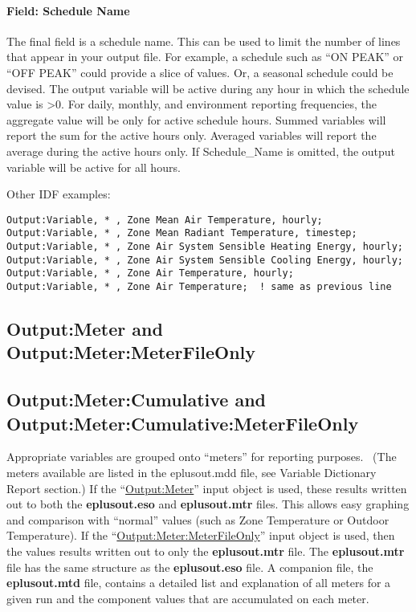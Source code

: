 \paragraph{Field: Schedule Name}\label{field-schedule-name-004}

The final field is a schedule name. This can be used to limit the number of lines that appear in your output file. For example, a schedule such as ``ON PEAK'' or ``OFF PEAK'' could provide a slice of values. Or, a seasonal schedule could be devised. The output variable will be active during any hour in which the schedule value is \textgreater{}0. For daily, monthly, and environment reporting frequencies, the aggregate value will be only for active schedule hours. Summed variables will report the sum for the active hours only. Averaged variables will report the average during the active hours only. If Schedule\_Name is omitted, the output variable will be active for all hours.

Other IDF examples:

\begin{lstlisting}
Output:Variable, * , Zone Mean Air Temperature, hourly;
Output:Variable, * , Zone Mean Radiant Temperature, timestep;
Output:Variable, * , Zone Air System Sensible Heating Energy, hourly;
Output:Variable, * , Zone Air System Sensible Cooling Energy, hourly;
Output:Variable, * , Zone Air Temperature, hourly;
Output:Variable, * , Zone Air Temperature;  ! same as previous line
\end{lstlisting}


\subsection{Output:\-Meter and Output:\-Meter:\-Meter\-File\-Only}\label{outputmeter-and-outputmetermeterfileonly}

\subsection{Output:\-Meter:\-Cumulative and Output:\-Meter:\-Cumulative:\-Meter\-File\-Only}\label{outputmetercumulative-and-outputmetercumulativemeterfileonly}

Appropriate variables are grouped onto ``meters'' for reporting purposes.~ (The meters available are listed in the eplusout.mdd file, see Variable Dictionary Report section.) If the ``\hyperref[outputmeter-and-outputmetermeterfileonly]{Output:Meter}'' input object is used, these results written out to both the \textbf{eplusout.eso} and \textbf{eplusout.mtr} files. This allows easy graphing and comparison with ``normal'' values (such as Zone Temperature or Outdoor Temperature). If the ``\hyperref[outputmeter-and-outputmetermeterfileonly]{Output:Meter:MeterFileOnly}'' input object is used, then the values results written out to only the \textbf{eplusout.mtr} file. The \textbf{eplusout.mtr} file has the same structure as the \textbf{eplusout.eso} file. A companion file, the \textbf{eplusout.mtd} file, contains a detailed list and explanation of all meters for a given run and the component values that are accumulated on each meter.

